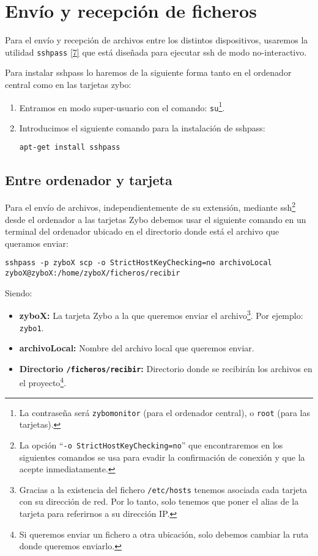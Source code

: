 \section{Envío y recepción de ficheros}
Para el envío y recepción de archivos entre los distintos dispositivos, usaremos la utilidad \texttt{sshpass} \hyperlink{7}{[7]} que está diseñada para ejecutar ssh de modo no-interactivo.

Para instalar sshpass lo haremos de la siguiente forma tanto en el ordenador central como en las tarjetas zybo:
\begin{enumerate}
	\item Entramos en modo super-usuario con el comando: \texttt{su}\footnote{La contraseña será \texttt{zybomonitor} (para el ordenador central), o \texttt{root} (para las tarjetas).}.
	\item Introducimos el siguiente comando para la instalación de sshpass:
	\begin{center}
		\texttt{apt-get install sshpass}
	\end{center}
\end{enumerate}
	
\subsection{Entre ordenador y tarjeta}
Para el envío de archivos, independientemente de su extensión, mediante ssh\footnote{La opción ``\texttt{-o StrictHostKeyChecking=no}'' que encontraremos en los siguientes comandos se usa para evadir la confirmación de conexión y que la acepte inmediatamente.} desde el ordenador a las tarjetas Zybo debemos usar el siguiente comando en un terminal del ordenador ubicado en el directorio donde está el archivo que queramos enviar:
\begin{center}
	\texttt{sshpass -p zyboX scp -o StrictHostKeyChecking=no archivoLocal zyboX@zyboX:/home/zyboX/ficheros/recibir}
\end{center}
Siendo:
\begin{itemize}
	\item \textbf{zyboX:} La tarjeta Zybo a la que queremos enviar el archivo\footnote{Gracias a la existencia del fichero \texttt{/etc/hosts} tenemos asociada cada tarjeta con su dirección de red. Por lo tanto, solo tenemos que poner el alias de la tarjeta para referirnos a su dirección IP.}. Por ejemplo: \texttt{zybo1}.
	\item \textbf{archivoLocal:} Nombre del archivo local que queremos enviar.
	\item \textbf{Directorio \texttt{/ficheros/recibir}:} Directorio donde se recibirán los archivos en el proyecto\footnote{Si queremos enviar un fichero a otra ubicación, solo debemos cambiar la ruta donde queremos enviarlo.}.
\end{itemize}

